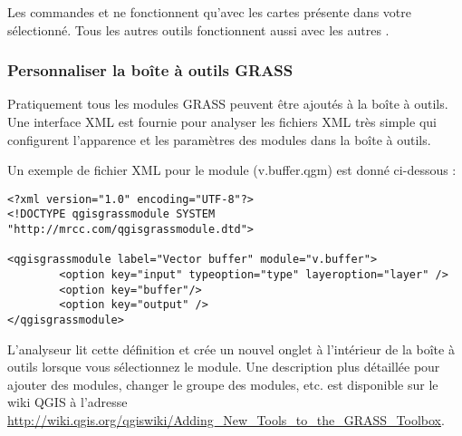 Les commandes  et  ne fonctionnent qu'avec les cartes présente dans votre  sélectionné. Tous les autres outils fonctionnent aussi avec les autres .

\subsubsection{Personnaliser la boîte à outils GRASS} 
\label{sec:toolbox-customizing}

Pratiquement tous les modules GRASS peuvent être ajoutés à la boîte à outils. Une interface XML est fournie pour analyser les fichiers XML 
très simple qui configurent l'apparence et les paramètres des modules dans la boîte à outils.

Un exemple de fichier XML pour le module  (v.buffer.qgm) est donné ci-dessous :
\begin{verbatim}
<?xml version="1.0" encoding="UTF-8"?>
<!DOCTYPE qgisgrassmodule SYSTEM "http://mrcc.com/qgisgrassmodule.dtd">

<qgisgrassmodule label="Vector buffer" module="v.buffer">
        <option key="input" typeoption="type" layeroption="layer" />
        <option key="buffer"/>
        <option key="output" />
</qgisgrassmodule>
\end{verbatim}

L'analyseur lit cette définition et crée un nouvel onglet à l'intérieur de la boîte à outils lorsque vous sélectionnez le module. Une description plus détaillée pour ajouter des modules, changer le groupe des modules, etc. est disponible sur le wiki QGIS à l'adresse \\\url{http://wiki.qgis.org/qgiswiki/Adding\_New\_Tools\_to\_the\_GRASS\_Toolbox}.